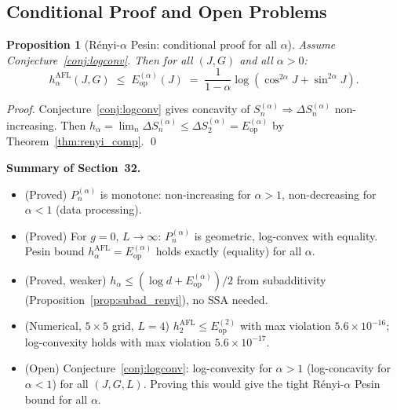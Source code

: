 \documentclass[12pt,a4paper]{article}
\newtheorem{proposition}[theorem]{Proposition}
\begin{document}
\subsection{Conditional Proof and Open Problems}
\label{subsec:renyi2_dp}

\begin{proposition}[Rényi-$\alpha$ Pesin: conditional proof for all $\alpha$]
\label{prop:renyi2_pesin}
Assume Conjecture~\ref{conj:logconv}. Then for all $(J,G)$ and all $\alpha>0$:
\[
  h_\alpha^{\mathrm{AFL}}(J,G) \;\leq\; E_{\mathrm{op}}^{(\alpha)}(J)
  \;=\;\frac{1}{1-\alpha}\log(\cos^{2\alpha}J+\sin^{2\alpha}J).
\]
\end{proposition}

\begin{proof}
Conjecture~\ref{conj:logconv} gives concavity of $S_n^{(\alpha)}\Rightarrow\Delta S_n^{(\alpha)}$
non-increasing. Then $h_\alpha=\lim_n\Delta S_n^{(\alpha)}\leq\Delta S_2^{(\alpha)}=E_{\mathrm{op}}^{(\alpha)}$
by Theorem~\ref{thm:renyi_comp}. \qed
\end{proof}

\bigskip
\noindent\textbf{Summary of Section~32.}
\begin{itemize}
\item (Proved) $P_n^{(\alpha)}$ is monotone: non-increasing for $\alpha>1$, non-decreasing for $\alpha<1$ (data processing).
\item (Proved) For $g=0$, $L\to\infty$: $P_n^{(\alpha)}$ is geometric, log-convex with equality.
  Pesin bound $h_\alpha^{\mathrm{AFL}}=E_{\mathrm{op}}^{(\alpha)}$ holds exactly (equality) for all $\alpha$.
\item (Proved, weaker) $h_\alpha\leq(\log d+E_{\mathrm{op}}^{(\alpha)})/2$ from subadditivity
  (Proposition~\ref{prop:subad_renyi}), no SSA needed.
\item (Numerical, $5\times 5$ grid, $L=4$) $h_2^{\mathrm{AFL}}\leq E_{\mathrm{op}}^{(2)}$ with max violation $5.6\times10^{-16}$;
  log-convexity holds with max violation $5.6\times10^{-17}$.
\item (Open) Conjecture~\ref{conj:logconv}: log-convexity for $\alpha>1$ (log-concavity for $\alpha<1$)
  for all $(J,G,L)$. Proving this would give the tight Rényi-$\alpha$ Pesin bound for all $\alpha$.
\end{itemize}

\end{document}
